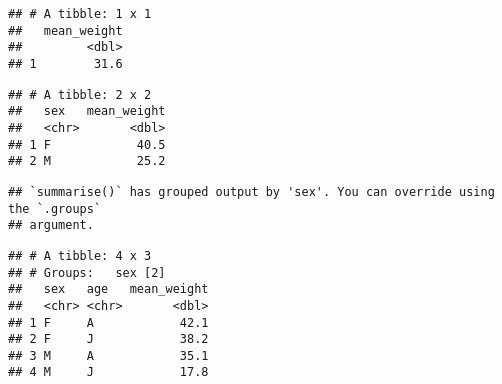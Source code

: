 \documentclass[
]{article}
\newenvironment{Shaded}{\begin{snugshade}}{\end{snugshade}}
\newcommand{\DataTypeTok}[1]{\textcolor[rgb]{0.13,0.29,0.53}{#1}}
\newcommand{\KeywordTok}[1]{\textcolor[rgb]{0.13,0.29,0.53}{\textbf{#1}}}
\newcommand{\NormalTok}[1]{#1}
\newcommand{\OperatorTok}[1]{\textcolor[rgb]{0.81,0.36,0.00}{\textbf{#1}}}
\newcommand{\StringTok}[1]{\textcolor[rgb]{0.31,0.60,0.02}{#1}}
\begin{document}
\begin{Shaded}
\end{Shaded}

\begin{verbatim}
## # A tibble: 1 x 1
##   mean_weight
##         <dbl>
## 1        31.6
\end{verbatim}

\begin{Shaded}
\end{Shaded}

\begin{verbatim}
## # A tibble: 2 x 2
##   sex   mean_weight
##   <chr>       <dbl>
## 1 F            40.5
## 2 M            25.2
\end{verbatim}

\begin{Shaded}
\end{Shaded}

\begin{verbatim}
## `summarise()` has grouped output by 'sex'. You can override using the `.groups`
## argument.
\end{verbatim}

\begin{verbatim}
## # A tibble: 4 x 3
## # Groups:   sex [2]
##   sex   age   mean_weight
##   <chr> <chr>       <dbl>
## 1 F     A            42.1
## 2 F     J            38.2
## 3 M     A            35.1
## 4 M     J            17.8
\end{verbatim}
\end{document}
